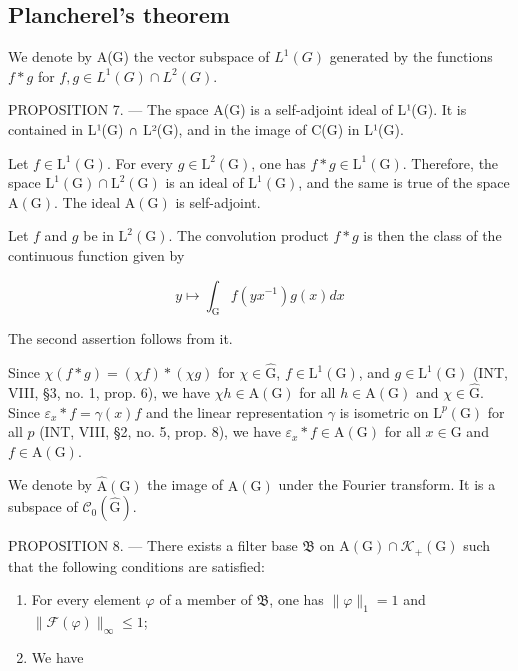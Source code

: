\subsection{Plancherel's theorem}

We denote by A(G) the vector subspace of \(L^{1}(G)\) generated by the functions \(f * g\) for \(f, g \in L^{1}(G) \cap L^{2}(G)\).

PROPOSITION 7. --- The space A(G) is a self-adjoint ideal of L¹(G). It is contained in L¹(G) ∩ L²(G), and in the image of C(G) in L¹(G).

Let \(f \in \mathrm{L}^1(\mathrm{G})\). For every \(g \in \mathrm{L}^2(\mathrm{G})\), one has \(f * g \in \mathrm{L}^1(\mathrm{G})\). Therefore, the space \(\mathrm{L}^1(\mathrm{G}) \cap \mathrm{L}^2(\mathrm{G})\) is an ideal of \(\mathrm{L}^1(\mathrm{G})\), and the same is true of the space \(\mathrm{A}(\mathrm{G})\). The ideal \(\mathrm{A}(\mathrm{G})\) is self-adjoint.

Let \(f\) and \(g\) be in \(\mathrm{L}^2(\mathrm{G})\). The convolution product \(f * g\) is then the class of the continuous function given by

\[
y \mapsto \int_ {\mathrm{G}} f (y x ^ {- 1}) g (x) d x
\]

The second assertion follows from it.

Since \(\chi(f*g) = (\chi f)*( \chi g)\) for \(\chi \in \widehat{\mathrm{G}}\), \(f \in \mathrm{L}^1(\mathrm{G})\), and \(g \in \mathrm{L}^1(\mathrm{G})\) (INT, VIII, §3, no. 1, prop. 6), we have \(\chi h \in \mathrm{A}(\mathrm{G})\) for all \(h \in \mathrm{A}(\mathrm{G})\) and \(\chi \in \widehat{\mathrm{G}}\). Since \(\varepsilon_x * f = \gamma(x)f\) and the linear representation \(\gamma\) is isometric on \(\mathrm{L}^p(\mathrm{G})\) for all \(p\) (INT, VIII, §2, no. 5, prop. 8), we have \(\varepsilon_x * f \in \mathrm{A}(\mathrm{G})\) for all \(x \in \mathrm{G}\) and \(f \in \mathrm{A}(\mathrm{G})\).

We denote by \(\widehat{\mathrm{A}}(\mathrm{G})\) the image of \(\mathrm{A}(\mathrm{G})\) under the Fourier transform. It is a subspace of \(\mathcal{C}_0(\widehat{\mathrm{G}})\).

PROPOSITION 8. --- There exists a filter base \(\mathfrak{B}\) on \(\mathrm{A}(\mathrm{G}) \cap \mathcal{K}_{+}(\mathrm{G})\) such that the following conditions are satisfied:

\begin{enumerate}
\def\labelenumi{(\roman{enumi})}
\item
  For every element \(\varphi\) of a member of \(\mathfrak{B}\), one has \(\|\varphi\|_1 = 1\) and \(\|\mathcal{F}(\varphi)\|_{\infty} \leqslant 1\);
\item
  We have
\end{enumerate}

